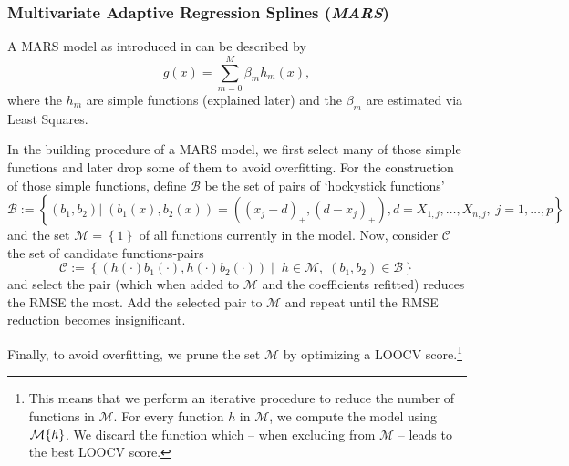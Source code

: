 \subsubsection*{Multivariate Adaptive Regression Splines (\textit{MARS})}{
    A MARS model as introduced in \cite{friedmanMultivariateAdaptiveRegression1991} can be described by 
    \begin{equation}
        \label{eq:mars}
        g(x) = \sum_{m=0}^M \beta_m h_m(x),
    \end{equation}
    where the $h_m$ are simple functions (explained later) and the $\beta_m$ are estimated via Least Squares. 
    
    In the building procedure of a MARS model, we first select many of those simple functions and later drop some of them to avoid overfitting. For the construction of those simple functions, define $\mathcal{B}$ be the set of pairs of `hockystick functions'
    \begin{equation}
        \label{eq:mars_basis_fun}
        \mathcal{B}:=\left\{
            \left(b_1,b_2\right) 
            | \;
            \left(b_1(x),b_2(x)\right) = \left(\left(x_{j}-d\right)_+,\left(d-x_{j}\right)_+\right),
            d =X_{1, j},  \ldots, X_{n, j},\;
            j=1, \ldots, p
        \right\}
    \end{equation}
    and the set $\mathcal{M}=\left\{1\right\}$ of all functions currently in the model. Now, consider $\mathcal{C}$ the set of candidate functions-pairs 
    \begin{equation}
        \label{eq:mars_candidate}
        \mathcal{C}:=\left\{
            \left(h(\cdot)b_1(\cdot),  h(\cdot)b_2(\cdot) \right)
            \;| \;\; h\in\mathcal{M}, \; 
            (b_1,b_2) \in \mathcal{B}
        \right\}
    \end{equation}
    and select the pair (which when added to $\mathcal{M}$ and the coefficients refitted) reduces the RMSE the most. Add the selected pair to $\mathcal{M}$ and repeat until the RMSE reduction becomes insignificant.

    Finally, to avoid overfitting, we prune the set $\mathcal{M}$ by optimizing a LOOCV score.\footnote{This means that we perform an iterative procedure to reduce the number of functions in $\mathcal{M}$. For every function $h$ in $\mathcal{M}$, we compute the model using $\mathcal{M}\\\{h\}$. We discard the function which -- when excluding from $\mathcal{M}$ -- leads to the best LOOCV score.}  

}

